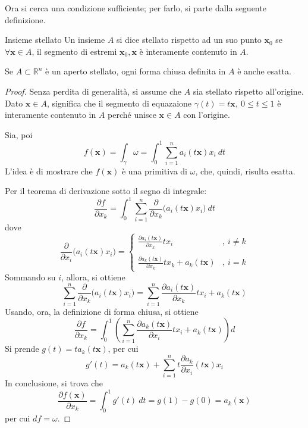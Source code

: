 \documentclass[11pt, a4paper]{scrartcl}
\theoremstyle{definition}
\numberwithin{esempio}{section}
\theoremstyle{definition}
\numberwithin{obs}{section}
\numberwithin{nota}{section}
\numberwithin{equation}{subsection}
\begin{document}
Ora si cerca una condizione sufficiente; per farlo, si parte dalla seguente definizione.
\begin{definizione}
	{Insieme stellato}{}
	Un insieme $A$ si dice stellato rispetto ad un suo punto $\mathbf{x} _0$ se $\forall \mathbf{x} \in A$, il segmento di estremi $\mathbf{x} _0, \mathbf{x} $ \`e interamente contenuto in $A$.
\end{definizione}
\begin{teorema}
	{}{}
	Se $A \subset \mathbb{R}^n$ \`e un aperto stellato, ogni forma chiusa definita in $A$ \`e anche esatta.
	\begin{proof}
		Senza perdita di generalit\`a, si assume che $A$ sia stellato rispetto all'origine.
Dato $\mathbf{x} \in A$, significa che il segmento di equazaione $\gamma(t) = t \mathbf{x} , \ 0\le t \le 1$ \`e interamente contenuto in $A$ perch\'e unisce $\mathbf{x} \in A$ con l'origine.

Sia, poi
\[
f(\mathbf{x} ) = \int_{\gamma} \omega = \int_{0} ^1  \sum_{i=1}^{n} a_i(t\mathbf{x} ) x_i \ dt 
\] 
L'idea \`e di mostrare che $f(\mathbf{x} )$ \`e una primitiva di $\omega$, che, quindi, risulta esatta.

Per il teorema di derivazione sotto il segno di integrale:
\[
\frac{\partial f}{\partial x_k} = \int_{0} ^1 \sum_{i=1}^{n} \frac{\partial }{\partial x_k} \big(a_i(t\mathbf{x} ) x_i\big) \ dt 
\] 
dove 
\[
\frac{\partial }{\partial x_i} \big(a_i(t\mathbf{x} ) x_i\big)= \begin{cases}
	\displaystyle \frac{\partial a_i(t\mathbf{x} )}{\partial x_k} t x_i &,\ i\neq k\\
	\\
	\displaystyle \frac{\partial a_k(t\mathbf{x} )}{\partial x_k} tx_k + a_k(t\mathbf{x} ) &,\ i = k
\end{cases}
\] 
Sommando su $i$, allora, si ottiene
\[
\sum_{i=1}^{n} \frac{\partial }{\partial x_k} \big(a_i(t\mathbf{x} ) x_i\big)= \sum_{i=1}^{n} \frac{\partial a_i(t\mathbf{x} )}{\partial x_k} tx_i +  a_k(t\mathbf{x} )
\] 
Usando, ora, la definizione di forma chiusa, si ottiene
\[
\frac{\partial f}{\partial x_k} = \int_{0} ^1 \left(\sum_{i=1}^{n} \frac{\partial a_k(t\mathbf{x} )}{\partial x_i} tx_i + a_k(t\mathbf{x} )\right)  d 
\] 
Si prende $g(t) = ta_k(t\mathbf{x} )$, per cui
\[
g' (t) = a_k (t\mathbf{x} ) + \sum_{i=1}^{n} t \frac{\partial a_k}{\partial x_i} (t\mathbf{x} ) x_i
\] 
In conclusione, si trova che
\[
\frac{\partial f(\mathbf{x} )}{\partial x_k} = \int_{0} ^1 g'(t) \ dt = g(1) - g(0) = a_k (\mathbf{x} )
\] 
per cui $df = \omega$.
	\end{proof}
\end{teorema}
\end{document}
